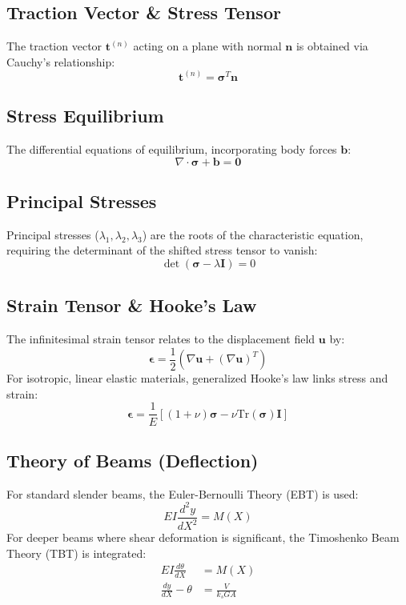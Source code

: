 \documentclass{article}
\begin{document}
\subsection{Traction Vector \& Stress Tensor}
The traction vector $\mathbf{t}^{(n)}$ acting on a plane with normal $\mathbf{n}$ is obtained via Cauchy's relationship:
\begin{equation}
    \mathbf{t}^{(n)} = \mathbf{\sigma}^T \mathbf{n}
\end{equation}

\subsection{Stress Equilibrium}
The differential equations of equilibrium, incorporating body forces $\mathbf{b}$:
\begin{equation}
    \nabla \cdot \mathbf{\sigma} + \mathbf{b} = \mathbf{0}
\end{equation}

\subsection{Principal Stresses}
Principal stresses ($\lambda_1, \lambda_2, \lambda_3$) are the roots of the characteristic equation, requiring the determinant of the shifted stress tensor to vanish:
\begin{equation}
    \det(\mathbf{\sigma} - \lambda\mathbf{I}) = 0
\end{equation}

\subsection{Strain Tensor \& Hooke's Law}
The infinitesimal strain tensor relates to the displacement field $\mathbf{u}$ by:
\begin{equation}
    \mathbf{\epsilon} = \frac{1}{2}(\nabla\mathbf{u} + (\nabla\mathbf{u})^T)
\end{equation}
For isotropic, linear elastic materials, generalized Hooke's law links stress and strain:
\begin{equation}
    \mathbf{\epsilon} = \frac{1}{E}[(1+\nu)\mathbf{\sigma} - \nu \text{Tr}(\mathbf{\sigma})\mathbf{I}]
\end{equation}

\subsection{Theory of Beams (Deflection)}
For standard slender beams, the Euler-Bernoulli Theory (EBT) is used:
\begin{equation}
    EI \frac{d^2y}{dX^2} = M(X)
\end{equation}
For deeper beams where shear deformation is significant, the Timoshenko Beam Theory (TBT) is integrated:
\begin{align}
    EI \frac{d\theta}{dX} &= M(X) \\
    \frac{dy}{dX} - \theta &= \frac{V}{k_s G A}
\end{align}
\end{document}
